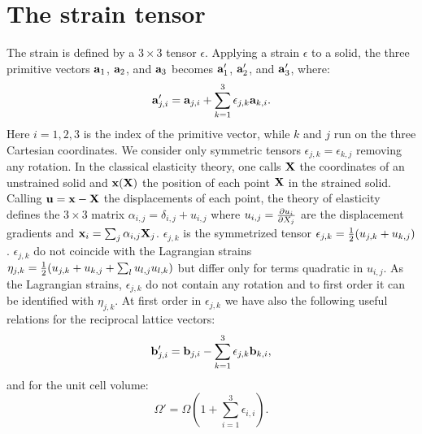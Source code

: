 \documentclass[12pt,a4paper]{article}
\begin{document}
\newpage

\section{\color{coral}The strain tensor}
The strain is defined by a $3\times 3$ tensor
$\epsilon$. Applying a strain $\epsilon$ to a solid, 
the three primitive vectors ${\bf a}_1$, ${\bf a}_2$, and ${\bf a}_3$
becomes 
${\bf a}'_1$, ${\bf a}'_2$, and ${\bf a}'_3$, where:
\begin{equation}
{\bf a}'_{j,i} = {\bf a}_{j,i} +  \sum_{k=1}^3 \epsilon_{j,k} {\bf a}_{k,i}.
\label{strain_def}
\end{equation}
Here $i=1,2,3$ is the index of the primitive vector, while $k$ and $j$ run
on the three Cartesian coordinates. We consider only symmetric tensors
$\epsilon_{j,k}=\epsilon_{k,j}$ removing any rotation. 
In the classical elasticity theory, one
calls ${\bf X}$ the coordinates of an unstrained solid and
${\bf x}({\bf X})$ the position of each point ${\bf X}$ in
the strained solid. Calling ${\bf u}= {\bf x} -{\bf X}$ the displacements
of each point, the theory of elasticity defines the $3\times3$ matrix
$\alpha_{i,j}=\delta_{i,j}+u_{i,j}$ where $u_{i,j}= {\partial u_i \over 
\partial X_j}$ are the displacement gradients and 
${\bf x}_i = \sum_j\alpha_{i,j} {\bf X}_j$. $\epsilon_{j,k}$
is the symmetrized tensor $\epsilon_{j,k}={1\over 2} ( u_{j,k} +
u_{k,j})$. $\epsilon_{j,k}$ do not coincide with the Lagrangian strains
$\eta_{j,k}={1\over 2} ( u_{j,k} + u_{k,j} + \sum_l u_{l,j}u_{l,k})$ but 
differ only for terms quadratic in $u_{i,j}$. As the Lagrangian strains, 
$\epsilon_{j,k}$ do not contain any rotation and to first order it can 
be identified with $\eta_{j,k}$. At first order in $\epsilon_{j,k}$ we have
also the following useful relations for the reciprocal lattice vectors:
\begin{equation}
{\bf b}'_{j,i} = {\bf b}_{j,i} -  \sum_{k=1}^3 \epsilon_{j,k} {\bf b}_{k,i},
\end{equation}
and for the unit cell volume:
\begin{equation}
\Omega'=\Omega \left( 1+\sum_{i=1}^3 \epsilon_{i,i} \right).
\end{equation}
\end{document}
